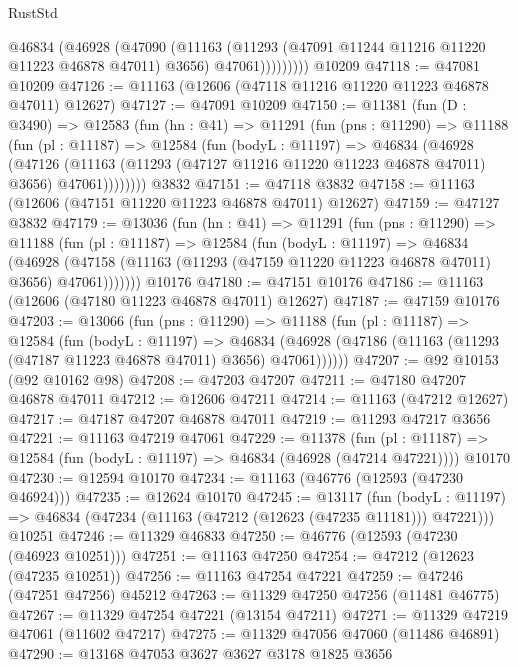 \begin{lexlean}{RustStd}
\begin{coremodule}
              @46834
                (@46928
                  (@47090
                    (@11163
                      (@11293 (@47091 @11244 @11216 @11220 @11223 @46878 @47011) @3656)
                      @47061)))))))))
    @10209
@47118 := @47081 @10209
@47126 := @11163 (@12606 (@47118 @11216 @11220 @11223 @46878 @47011) @12627)
@47127 := @47091 @10209
@47150 := @11381
    (fun (D : @3490) =>
    @12583
      (fun (hn : @41) =>
      @11291
        (fun (pns : @11290) =>
        @11188
          (fun (pl : @11187) =>
          @12584
            (fun (bodyL : @11197) =>
            @46834
              (@46928
                (@47126
                  (@11163 (@11293 (@47127 @11216 @11220 @11223 @46878 @47011) @3656) @47061))))))))
    @3832
@47151 := @47118 @3832
@47158 := @11163 (@12606 (@47151 @11220 @11223 @46878 @47011) @12627)
@47159 := @47127 @3832
@47179 := @13036
    (fun (hn : @41) =>
    @11291
      (fun (pns : @11290) =>
      @11188
        (fun (pl : @11187) =>
        @12584
          (fun (bodyL : @11197) =>
          @46834
            (@46928
              (@47158 (@11163 (@11293 (@47159 @11220 @11223 @46878 @47011) @3656) @47061)))))))
    @10176
@47180 := @47151 @10176
@47186 := @11163 (@12606 (@47180 @11223 @46878 @47011) @12627)
@47187 := @47159 @10176
@47203 := @13066
    (fun (pns : @11290) =>
    @11188
      (fun (pl : @11187) =>
      @12584
        (fun (bodyL : @11197) =>
        @46834 (@46928 (@47186 (@11163 (@11293 (@47187 @11223 @46878 @47011) @3656) @47061))))))
@47207 := @92 @10153 (@92 @10162 @98)
@47208 := @47203 @47207
@47211 := @47180 @47207 @46878 @47011
@47212 := @12606 @47211
@47214 := @11163 (@47212 @12627)
@47217 := @47187 @47207 @46878 @47011
@47219 := @11293 @47217 @3656
@47221 := @11163 @47219 @47061
@47229 := @11378
    (fun (pl : @11187) => @12584 (fun (bodyL : @11197) => @46834 (@46928 (@47214 @47221))))
    @10170
@47230 := @12594 @10170
@47234 := @11163 (@46776 (@12593 (@47230 @46924)))
@47235 := @12624 @10170
@47245 := @13117
    (fun (bodyL : @11197) => @46834 (@47234 (@11163 (@47212 (@12623 (@47235 @11181))) @47221)))
    @10251
@47246 := @11329 @46833
@47250 := @46776 (@12593 (@47230 (@46923 @10251)))
@47251 := @11163 @47250
@47254 := @47212 (@12623 (@47235 @10251))
@47256 := @11163 @47254 @47221
@47259 := @47246 (@47251 @47256) @45212
@47263 := @11329 @47250 @47256 (@11481 @46775)
@47267 := @11329 @47254 @47221 (@13154 @47211)
@47271 := @11329 @47219 @47061 (@11602 @47217)
@47275 := @11329 @47056 @47060 (@11486 @46891)
@47290 := @13168
    @47053
    @3627
    @3627
    @3178
    @1825
    @3656

\end{coremodule}
\end{lexlean}
